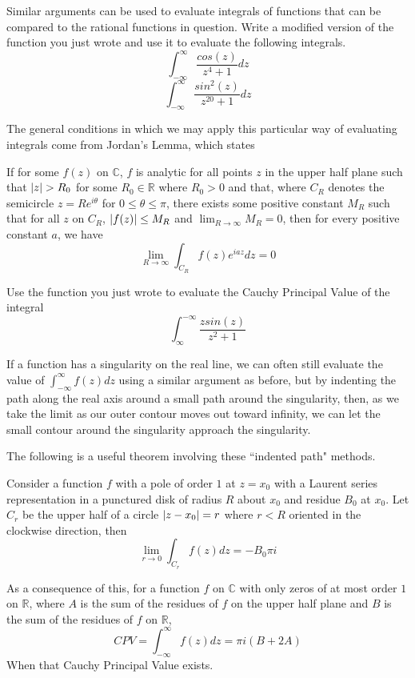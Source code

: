 \begin{problem}
Similar arguments can be used to evaluate integrals of functions that can be compared to the rational functions in question.
Write a modified version of the function you just wrote and use it to evaluate the following integrals.
$$\int_{-\infty}^{\infty}\frac{cos(z)}{z^4+1}dz$$
$$\int_{-\infty}^{\infty}\frac{sin^2(z)}{z^{20}+1}dz$$
\end{problem}

The general conditions in which we may apply this particular way of evaluating integrals come from Jordan's Lemma, which states
\begin{lemma}
If for some $f(z)$ on $\mathbb{C}$, $f$ is analytic for all points $z$ in the upper half plane such that $\left\lvert z\right\rvert>R_0$ for some $R_0 \in \mathbb{R}$ where $R_0 >0$ and that, where $C_R$ denotes the semicircle $z=Re^{i\theta}$ for $0\leq \theta \leq \pi$, there exists some positive constant $M_R$ such that for all $z$ on $C_R$, $\left\lvert f(z)\right\rvert \leq M_R$ and $\lim_{R \to \infty} M_R = 0$, then for every positive constant $a$, we have
$$\lim_{R \to \infty} \int_{C_R} f(z) e^{iaz} dz = 0$$
\end{lemma}
\begin{problem}
Use the function you just wrote to evaluate the Cauchy Principal Value of the integral
$$\int_{\infty}^{-\infty} \frac{z sin(z)}{z^2+1}$$
\end{problem}

If a function has a singularity on the real line, we can often still evaluate the value of $\int_{-\infty}^{\infty} f(z) dz$ using a similar argument as before, but by indenting the path along the real axis around a small path around the singularity, then, as we take the limit as our outer contour moves out toward infinity, we can let the small contour around the singularity approach the singularity.

The following is a useful theorem involving these ``indented path" methods.
\begin{theorem}
Consider a function $f$ with a pole of order $1$ at $z=x_0$ with a Laurent series representation in a punctured disk of radius $R$ about $x_0$ and residue $B_0$ at $x_0$.
Let $C_r$ be the upper half of a circle $\left\lvert z-x_0\right\rvert=r$ where $r<R$ oriented in the clockwise direction, then
$$\lim_{r\to 0} \int_{C_r} f(z) dz = - B_0 \pi i$$
\end{theorem}
As a consequence of this, for a function $f$ on $\mathbb{C}$ with only zeros of at most order $1$ on $\mathbb{R}$, where $A$ is the sum of the residues of $f$ on the upper half plane and $B$ is the sum of the residues of $f$ on $\mathbb{R}$, 
$$CPV = \int_{-\infty}^{\infty} f(z) dz = \pi i (B+2A)$$ 
When that Cauchy Principal Value exists.


